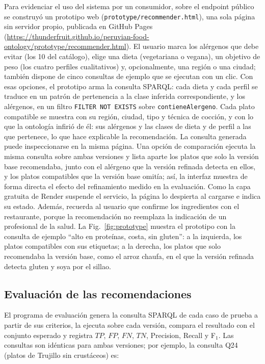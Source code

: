 \documentclass[conference]{IEEEtran}
\begin{document}
Para evidenciar el uso del sistema por un consumidor, sobre el endpoint público se construyó un prototipo web (\texttt{prototype/recommender.html}), una sola página sin servidor propio, publicada en GitHub Pages (\url{https://thunderfruit.github.io/peruvian-food-ontology/prototype/recommender.html}). El usuario marca los alérgenos que debe evitar (los 10 del catálogo), elige una dieta (vegetariana o vegana), un objetivo de peso (los cuatro perfiles cualitativos) y, opcionalmente, una región o una ciudad; también dispone de cinco consultas de ejemplo que se ejecutan con un clic. Con esas opciones, el prototipo arma la consulta SPARQL: cada dieta y cada perfil se traduce en un patrón de pertenencia a la clase inferida correspondiente, y los alérgenos, en un filtro \texttt{FILTER NOT EXISTS} sobre \texttt{contieneAlergeno}. Cada plato compatible se muestra con su región, ciudad, tipo y técnica de cocción, y con lo que la ontología infirió de él: sus alérgenos y las clases de dieta y de perfil a las que pertenece, lo que hace explicable la recomendación. La consulta generada puede inspeccionarse en la misma página. Una opción de comparación ejecuta la misma consulta sobre ambas versiones y lista aparte los platos que solo la versión base recomendaba, junto con el alérgeno que la versión refinada detecta en ellos, y los platos compatibles que la versión base omitía; así, la interfaz muestra de forma directa el efecto del refinamiento medido en la evaluación. Como la capa gratuita de Render suspende el servicio, la página lo despierta al cargarse e indica su estado. Además, recuerda al usuario que confirme los ingredientes con el restaurante, porque la recomendación no reemplaza la indicación de un profesional de la salud. La Fig.~\ref{fig:prototype} muestra el prototipo con la consulta de ejemplo ``alto en proteínas, costa, sin gluten'': a la izquierda, los platos compatibles con sus etiquetas; a la derecha, los platos que solo recomendaba la versión base, como el arroz chaufa, en el que la versión refinada detecta gluten y soya por el sillao.



\subsection{Evaluación de las recomendaciones}

El programa de evaluación genera la consulta SPARQL de cada caso de prueba a partir de sus criterios, la ejecuta sobre cada versión, compara el resultado con el conjunto esperado y registra $TP$, $FP$, $FN$, $TN$, Precision, Recall y F$_1$. Las consultas son idénticas para ambas versiones; por ejemplo, la consulta Q24 (platos de Trujillo sin crustáceos) es:
\end{document}
